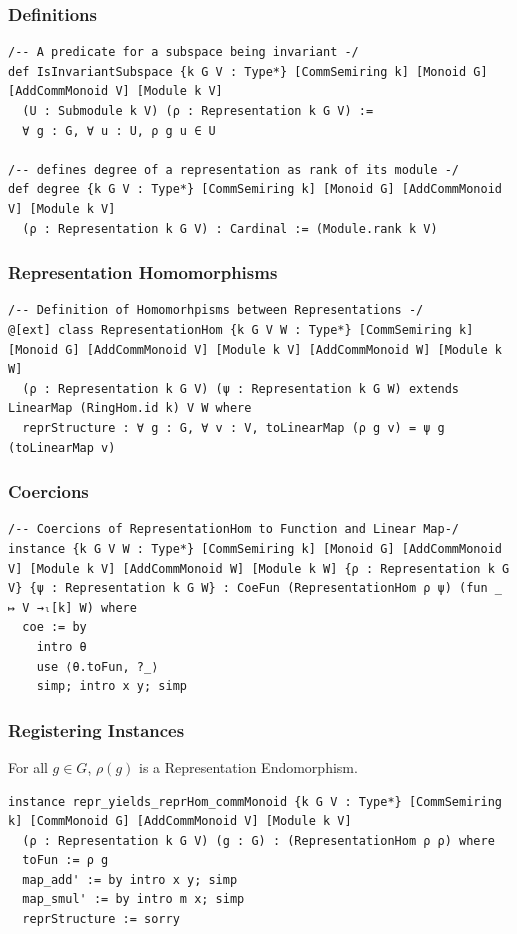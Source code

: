 \documentclass{beamer}
\begin{document}
\begin{frame}[fragile]
\frametitle{Definitions}
\begin{lstlisting}
/-- A predicate for a subspace being invariant -/
def IsInvariantSubspace {k G V : Type*} [CommSemiring k] [Monoid G] [AddCommMonoid V] [Module k V]
  (U : Submodule k V) (ρ : Representation k G V) :=
  ∀ g : G, ∀ u : U, ρ g u ∈ U

/-- defines degree of a representation as rank of its module -/
def degree {k G V : Type*} [CommSemiring k] [Monoid G] [AddCommMonoid V] [Module k V]
  (ρ : Representation k G V) : Cardinal := (Module.rank k V)
\end{lstlisting}
\end{frame}


\begin{frame}[fragile]
\frametitle{Representation Homomorphisms}
\begin{lstlisting}
/-- Definition of Homomorhpisms between Representations -/
@[ext] class RepresentationHom {k G V W : Type*} [CommSemiring k] [Monoid G] [AddCommMonoid V] [Module k V] [AddCommMonoid W] [Module k W]
  (ρ : Representation k G V) (ψ : Representation k G W) extends LinearMap (RingHom.id k) V W where
  reprStructure : ∀ g : G, ∀ v : V, toLinearMap (ρ g v) = ψ g (toLinearMap v)
\end{lstlisting}
\end{frame}

\begin{frame}[fragile]
\frametitle{Coercions}
\begin{lstlisting}
/-- Coercions of RepresentationHom to Function and Linear Map-/
instance {k G V W : Type*} [CommSemiring k] [Monoid G] [AddCommMonoid V] [Module k V] [AddCommMonoid W] [Module k W] {ρ : Representation k G V} {ψ : Representation k G W} : CoeFun (RepresentationHom ρ ψ) (fun _ ↦ V →ₗ[k] W) where
  coe := by
    intro θ
    use ⟨θ.toFun, ?_⟩
    simp; intro x y; simp
\end{lstlisting}
\end{frame}

\begin{frame}[fragile]
\frametitle{Registering Instances}
\begin{lemma}
For all \(g \in G\), \(\rho(g)\) is a Representation Endomorphism.
\end{lemma}
\begin{lstlisting}
instance repr_yields_reprHom_commMonoid {k G V : Type*} [CommSemiring k] [CommMonoid G] [AddCommMonoid V] [Module k V]
  (ρ : Representation k G V) (g : G) : (RepresentationHom ρ ρ) where
  toFun := ρ g
  map_add' := by intro x y; simp
  map_smul' := by intro m x; simp
  reprStructure := sorry
\end{lstlisting}
\end{frame}
\end{document}
